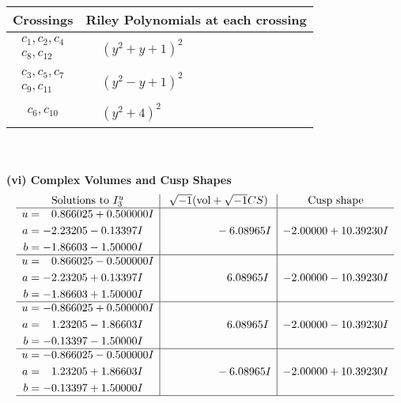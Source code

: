 \documentclass[1p]{elsarticle_modified}
\theoremstyle{definition}
\newcommand{\I}{\sqrt{-1}}
\begin{document}
\begin{tabular}{m{50pt}|m{274pt}}
Crossings & \hspace{64pt}Riley Polynomials at each crossing \\
\hline $$\begin{aligned}c_{1},c_{2},c_{4}\\c_{8},c_{12}\end{aligned}$$&$\begin{aligned}
&(y^2+y+1)^2
\end{aligned}$\\
\hline $$\begin{aligned}c_{3},c_{5},c_{7}\\c_{9},c_{11}\end{aligned}$$&$\begin{aligned}
&(y^2- y+1)^2
\end{aligned}$\\
\hline $$\begin{aligned}c_{6},c_{10}\end{aligned}$$&$\begin{aligned}
&(y^2+4)^2
\end{aligned}$\\
\hline
\end{tabular}\\~\\
\newpage\flushleft \textbf{(vi) Complex Volumes and Cusp Shapes}
$$\begin{array}{c|c|c}  
\text{Solutions to }I^u_{3}& \I (\text{vol} + \sqrt{-1}CS) & \text{Cusp shape}\\
 \hline 
\begin{aligned}
u &= \phantom{-}0.866025 + 0.500000 I \\
a &= -2.23205 - 0.13397 I \\
b &= -1.86603 - 1.50000 I\end{aligned}
 & \phantom{-0.000000 } -6.08965 I & -2.00000 + 10.39230 I \\ \hline\begin{aligned}
u &= \phantom{-}0.866025 - 0.500000 I \\
a &= -2.23205 + 0.13397 I \\
b &= -1.86603 + 1.50000 I\end{aligned}
 & \phantom{-0.000000 -}6.08965 I & -2.00000 - 10.39230 I \\ \hline\begin{aligned}
u &= -0.866025 + 0.500000 I \\
a &= \phantom{-}1.23205 - 1.86603 I \\
b &= -0.13397 - 1.50000 I\end{aligned}
 & \phantom{-0.000000 -}6.08965 I & -2.00000 - 10.39230 I \\ \hline\begin{aligned}
u &= -0.866025 - 0.500000 I \\
a &= \phantom{-}1.23205 + 1.86603 I \\
b &= -0.13397 + 1.50000 I\end{aligned}
 & \phantom{-0.000000 } -6.08965 I & -2.00000 + 10.39230 I\\
 \hline 
 \end{array}$$\newpage\newpage\renewcommand{\arraystretch}{1}
\end{document}
